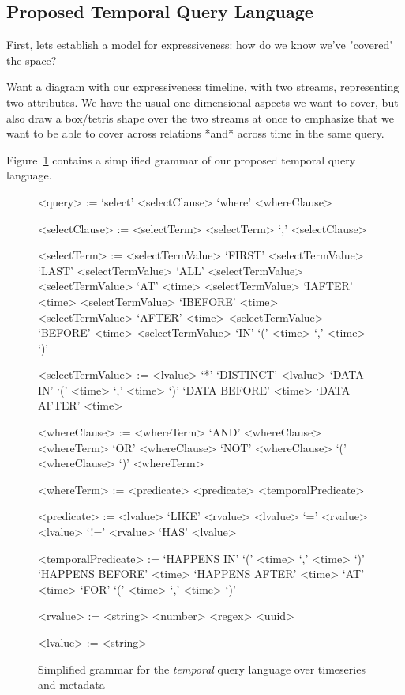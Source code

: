 \subsection{Proposed Temporal Query Language}

First, lets establish a model for expressiveness: how do we know we've "covered" the space?

Want a diagram with our expressiveness timeline, with two streams, representing two attributes. We
have the usual one dimensional aspects we want to cover, but also draw a box/tetris shape over
the two streams at once to emphasize that we want to be able to cover across relations *and* across
time in the same query.
\fi

Figure~\ref{fig:temporalgrammar} contains a simplified grammar of our proposed temporal query language.

\setlength{\grammarindent}{8em}
\setlength{\grammarparsep}{4pt}
\begin{figure}
\centering
\begin{grammar}
<query> := `select' <selectClause> `where' <whereClause>

<selectClause> := <selectTerm>
\alt <selectTerm> `,' <selectClause>

<selectTerm> := <selectTermValue>
\alt `FIRST' <selectTermValue>
\alt `LAST' <selectTermValue>
\alt `ALL' <selectTermValue>
\alt <selectTermValue> `AT' <time>
\alt <selectTermValue> `IAFTER' <time>
\alt <selectTermValue> `IBEFORE' <time>
\alt <selectTermValue> `AFTER' <time>
\alt <selectTermValue> `BEFORE' <time>
\alt <selectTermValue> `IN' `(' <time> `,' <time> `)'

<selectTermValue> := <lvalue>
\alt `*'
\alt `DISTINCT' <lvalue>
\alt `DATA IN' `(' <time> `,' <time> `)'
\alt `DATA BEFORE' <time>
\alt `DATA AFTER' <time>

<whereClause> := <whereTerm> `AND' <whereClause>
\alt <whereTerm> `OR' <whereClause>
\alt `NOT' <whereClause>
\alt `(' <whereClause> `)'
\alt <whereTerm>

<whereTerm> := <predicate>
\alt <predicate> <temporalPredicate>

<predicate> := <lvalue> `LIKE' <rvalue>
\alt <lvalue> `=' <rvalue>
\alt <lvalue> `!=' <rvalue>
\alt `HAS' <lvalue>

<temporalPredicate> := `HAPPENS IN' `(' <time> `,' <time> `)'
\alt `HAPPENS BEFORE' <time>
\alt `HAPPENS AFTER' <time>
\alt `AT' <time>
\alt `FOR' `(' <time> `,' <time> `)'

<rvalue> := <string>
\alt <number>
\alt <regex>
\alt <uuid>

<lvalue> := <string>
\end{grammar}
\caption{Simplified grammar for the \emph{temporal} query language over timeseries and metadata}
\label{fig:temporalgrammar}
\end{figure}

